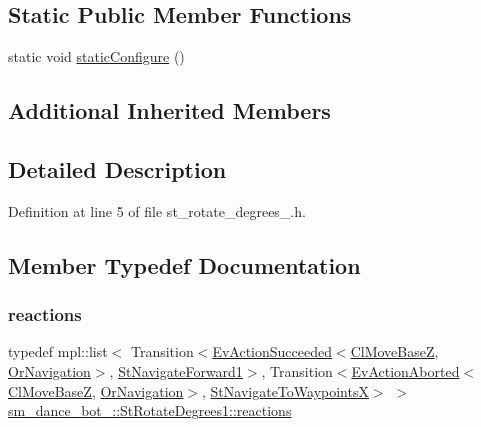 \subsection*{Static Public Member Functions}
\begin{DoxyCompactItemize}
\item 
static void \hyperlink{structsm__dance__bot__2_1_1StRotateDegrees1_aa1ac1bb8334e31e0550df507ddd8e8c0}{static\+Configure} ()
\end{DoxyCompactItemize}
\subsection*{Additional Inherited Members}


\subsection{Detailed Description}


Definition at line 5 of file st\+\_\+rotate\+\_\+degrees\+\_.\+h.



\subsection{Member Typedef Documentation}
\mbox{\label{structsm__dance__bot__2_1_1StRotateDegrees1_a50b1e24f473a1ab50a3e97bd7e38fdab}} 
\subsubsection{\texorpdfstring{reactions}{reactions}}
{\footnotesize\ttfamily typedef mpl\+::list$<$ Transition$<$\hyperlink{structsmacc_1_1default__events_1_1EvActionSucceeded}{Ev\+Action\+Succeeded}$<$\hyperlink{classcl__move__base__z_1_1ClMoveBaseZ}{Cl\+Move\+BaseZ}, \hyperlink{classsm__dance__bot__2_1_1OrNavigation}{Or\+Navigation}$>$, \hyperlink{structsm__dance__bot__2_1_1StNavigateForward1}{St\+Navigate\+Forward1}$>$, Transition$<$\hyperlink{structsmacc_1_1default__events_1_1EvActionAborted}{Ev\+Action\+Aborted}$<$\hyperlink{classcl__move__base__z_1_1ClMoveBaseZ}{Cl\+Move\+BaseZ}, \hyperlink{classsm__dance__bot__2_1_1OrNavigation}{Or\+Navigation}$>$, \hyperlink{structsm__dance__bot__2_1_1StNavigateToWaypointsX}{St\+Navigate\+To\+WaypointsX}$>$ $>$ \hyperlink{structsm__dance__bot__2_1_1StRotateDegrees1_a50b1e24f473a1ab50a3e97bd7e38fdab}{sm\+\_\+dance\+\_\+bot\+\_\+::\+St\+Rotate\+Degrees1\+::reactions}}




